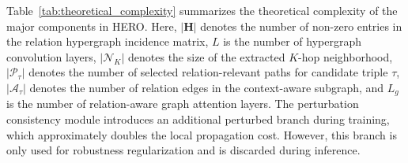 \documentclass[a4paper,fleqn]{cas-sc}
\begin{document}
Table~\ref{tab:theoretical_complexity} summarizes the theoretical complexity of the major components in HERO. Here, $|\mathbf{H}|$ denotes the number of non-zero entries in the relation hypergraph incidence matrix, $L$ is the number of hypergraph convolution layers, $|\mathcal{N}_{K}|$ denotes the size of the extracted $K$-hop neighborhood, $|\mathcal{P}_{\tau}|$ denotes the number of selected relation-relevant paths for candidate triple $\tau$, $|\mathcal{A}_{\tau}|$ denotes the number of relation edges in the context-aware subgraph, and $L_g$ is the number of relation-aware graph attention layers. The perturbation consistency module introduces an additional perturbed branch during training, which approximately doubles the local propagation cost. However, this branch is only used for robustness regularization and is discarded during inference.

\begin{table}[t]
\centering
\caption{Model size and memory consumption on three datasets. Params denotes the number of trainable parameters. GPU memory is measured during training under the same batch size setting.}
\label{tab:params_memory}
\end{table}
\end{document}
